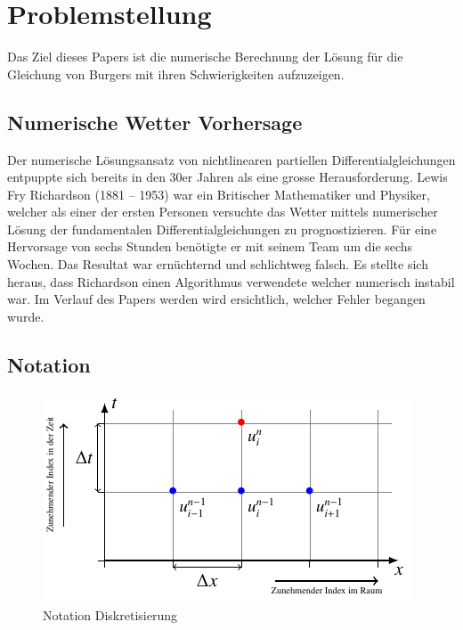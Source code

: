 %
%
\section{Problemstellung
\label{burgers:section:problemstellung}}

	Das Ziel dieses Papers ist die numerische Berechnung der Lösung für die Gleichung von Burgers mit ihren Schwierigkeiten aufzuzeigen.



	\subsection{Numerische Wetter Vorhersage}
	\label{burgers:sec:nwp}

	Der numerische L\"osungsansatz von nichtlinearen partiellen Differentialgleichungen entpuppte sich bereits in den 30er Jahren als eine grosse Herausforderung.
	Lewis Fry Richardson (1881 -- 1953) war ein Britischer Mathematiker und Physiker, welcher als einer der ersten Personen versuchte das Wetter mittels numerischer Lösung der fundamentalen Differentialgleichungen zu prognostizieren.
	F\"ur eine Hervorsage von sechs Stunden ben\"otigte er mit seinem Team um die sechs Wochen.
	Das Resultat war ern\"uchternd und schlichtweg falsch.
	Es stellte sich heraus, dass Richardson einen Algorithmus verwendete welcher numerisch instabil war.
	Im Verlauf des Papers werden wird ersichtlich, welcher Fehler begangen wurde.

	\subsection{Notation}

     \begin{figure}
       \centering
       \includegraphics[width=.8\textwidth]{papers/burgers/BurgersEquation/tikz/Gitter/gitter.pdf}
       \caption{Notation Diskretisierung}
       \label{burgers:fig:Disk}
     \end{figure}


